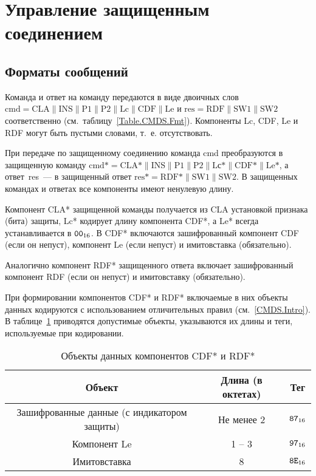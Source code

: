 \section{Управление защищенным соединением}
\label{CMDS.SM}

\subsection{Форматы сообщений}\label{CMDS.SM.Format}

Команда и ответ на команду передаются в виде двоичных слов 
$\text{cmd} = \text{CLA} \parallel \text{INS} \parallel \text{P1} \parallel 
\text{P2} \parallel \text{Lc} \parallel \text{CDF} \parallel \text{Le}$ и 
$\text{res} = \text{RDF} \parallel \text{SW1} \parallel \text{SW2}$ 
соответственно (см.~таблицу~\ref{Table.CMDS.Fmt}). 
%
Компоненты Lc, CDF, Le и RDF могут быть пустыми словами, т.~е. отсутствовать.

При передаче по защищенному соединению команда cmd преобразуются в защищенную 
команду
$\text{cmd*} = \text{CLA*} \parallel \text{INS} \parallel \text{P1} 
\parallel \text{P2} \parallel \text{Lс*} \parallel \text{CDF*} 
\parallel \text{Le*}$, а ответ~res~--- в защищенный ответ 
$\text{res*} = \text{RDF*} \parallel \text{SW1} \parallel \text{SW2}$. 
%
В защищенных командах и ответах все компоненты имеют ненулевую длину. 

Компонент CLA* защищенной команды получается из CLA установкой признака 
(бита) защиты, Lc* кодирует длину компонента CDF*, 
а Le* всегда устанавливается в $\texttt{00}_{16}$. 
%
В CDF* включаются зашифрованный компонент CDF (если он непуст), 
компонент Le (если непуст) и имитовставка (обязательно). 

Аналогично компонент RDF* защищенного ответа включает зашифрованный 
компонент RDF (если он непуст) и имитовставку (обязательно). 

При формировании компонентов CDF* и RDF* включаемые в них объекты данных
кодируются с использованием отличительных правил (см.~\ref{CMDS.Intro}). 
В таблице~\ref{Table.CMDS.CDFRDF} приводятся допустимые объекты, 
указываются их длины и теги, используемые при кодировании. 

\begin{table}[h]
\caption{Объекты данных компонентов CDF* и RDF*}
\label{Table.CMDS.CDFRDF}
\begin{tabular}{|c|c|c|}
\hline
Объект & Длина (в октетах) & Тег \\
\hline
\hline
Зашифрованные данные (с индикатором защиты) & Не менее 2 & $\texttt{87}_{16}$ \\
\hline
Компонент Le & 1 -- 3 & $\texttt{97}_{16}$\\
\hline      
Имитовставка & 8 & $\texttt{8E}_{16}$ \\
\hline
\end{tabular}
\end{table}

